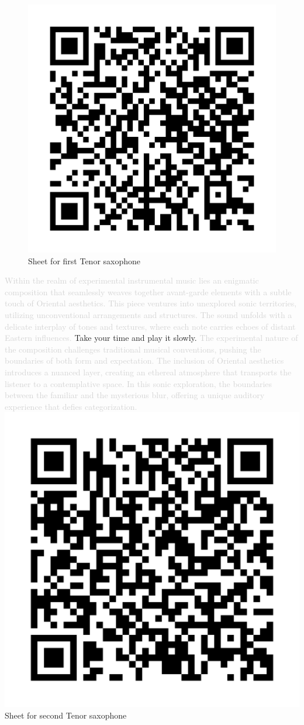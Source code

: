 \begin{figure}
\includegraphics[width=1\linewidth]{QR_Codes/QR_Mohn_TenSax_1.png}\\
Sheet for first Tenor saxophone
\end{figure}

\textcolor{lightgray}{Within the realm of experimental instrumental music lies an enigmatic composition that seamlessly weaves together avant-garde elements with a subtle touch of Oriental aesthetics. This piece ventures into unexplored sonic territories, utilizing unconventional arrangements and structures. The sound unfolds with a delicate interplay of tones and textures, where each note carries echoes of distant Eastern influences.} Take your time and play it slowly. \textcolor{lightgray}{The experimental nature of the composition challenges traditional musical conventions, pushing the boundaries of both form and expectation. The inclusion of Oriental aesthetics introduces a nuanced layer, creating an ethereal atmosphere that transports the listener to a contemplative space. In this sonic exploration, the boundaries between the familiar and the mysterious blur, offering a unique auditory experience that defies categorization.}\\

\includegraphics[width=0.2\linewidth]{QR_Codes/QR_Mohn_TenSax_2.png}\\
Sheet for second Tenor saxophone
